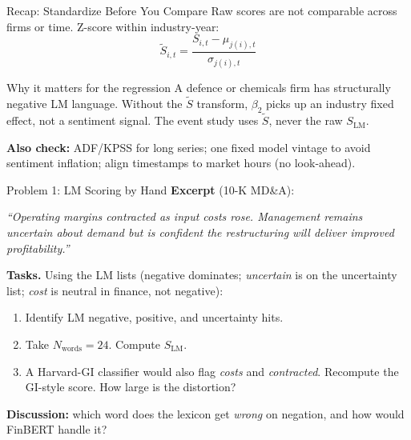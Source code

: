 \documentclass[9pt,t]{beamer}
\begin{document}
\begin{frame}{Recap: Standardize Before You Compare}
Raw scores are not comparable across firms or time. Z-score within industry-year:
\[
\tilde S_{i,t}=\frac{S_{i,t}-\mu_{j(i),t}}{\sigma_{j(i),t}}
\]

\medskip
\begin{block}{Why it matters for the regression}
A defence or chemicals firm has structurally negative LM language. Without the
$\tilde S$ transform, $\beta_2$ picks up an industry fixed effect, not a sentiment
signal. The event study uses $\tilde S$, never the raw $S_{\text{LM}}$.
\end{block}

\medskip
\textbf{Also check:} ADF/KPSS for long series; one fixed model vintage to avoid
sentiment inflation; align timestamps to market hours (no look-ahead).
\end{frame}

\begin{frame}{Problem 1: LM Scoring by Hand}
\textbf{Excerpt} (10-K MD\&A):
\begin{exampleblock}{}
\textit{``Operating margins contracted as input costs rose. Management remains
uncertain about demand but is confident the restructuring will deliver
improved profitability.''}
\end{exampleblock}

\medskip
\textbf{Tasks.} Using the LM lists (negative dominates; \emph{uncertain} is on the
uncertainty list; \emph{cost} is \alert{neutral} in finance, not negative):
\begin{enumerate}
  \item Identify LM negative, positive, and uncertainty hits.
  \item Take $N_{\text{words}}=24$. Compute $S_{\text{LM}}$.
  \item A Harvard-GI classifier would also flag \emph{costs} and \emph{contracted}.
        Recompute the GI-style score. How large is the distortion?
\end{enumerate}

\medskip
\textbf{Discussion:} which word does the lexicon get \emph{wrong} on negation,
and how would FinBERT handle it?
\end{frame}
\end{document}
